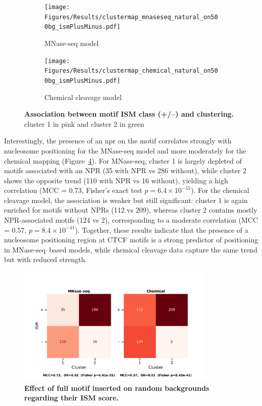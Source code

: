 \documentclass[11pt]{book}
\begin{document}
\begin{figure}[htbp]
\centering
\begin{subfigure}{0.48\textwidth}
    \centering
    \texttt{[image: Figures/Results/clustermap\_mnaseseq\_natural\_on500bg\_ismPlusMinus.pdf]}
    \caption{MNase-seq model}
    \label{fig:ctcf_ism_bg_mnase}
\end{subfigure}
\hfill
\begin{subfigure}{0.48\textwidth}
    \centering
    \texttt{[image: Figures/Results/clustermap\_chemical\_natural\_on500bg\_ismPlusMinus.pdf]}
    \caption{Chemical cleavage model}
    \label{fig:ctcf_ism_bg_chemical}
\end{subfigure}
\caption{\textbf{Association between motif ISM class (+/–) and clustering.} cluster 1 in pink and cluster 2 in green}
\label{fig:ctcf_ism_bg_cluster}
\end{figure}

Interestingly, the presence of an \gls{npr} on the motif correlates strongly with nucleosome positioning for the MNase-seq model and more moderately for the chemical mapping (Figure~\ref{fig:ctcf_contingency}). For MNase-seq, cluster 1 is largely depleted of motifs associated with an NPR (35 with NPR vs 286 without), while cluster 2 shows the opposite trend (110 with NPR vs 16 without), yielding a high correlation (MCC = 0.73, Fisher’s exact test $p = 6.4 \times 10^{-55}$). For the chemical cleavage model, the association is weaker but still significant: cluster 1 is again enriched for motifs without NPRs (112 vs 209), whereas cluster 2 contains mostly NPR-associated motifs (124 vs 2), corresponding to a moderate correlation (MCC = 0.57, $p = 8.4 \times 10^{-41}$). Together, these results indicate that the presence of a nucleosome positioning region at CTCF motifs is a strong predictor of positioning in MNase-seq–based models, while chemical cleavage data capture the same trend but with reduced strength.


\begin{figure}[htbp]
\centering
    \includegraphics[width=0.85\textwidth]{Figures/Results/contingency_stats_natural_on500bg_ismPlusMinus.pdf}
    \caption{\textbf{Effect of full motif inserted on random backgrounds regarding their ISM score.}}
    \label{fig:ctcf_contingency}
\end{figure}
\end{document}
